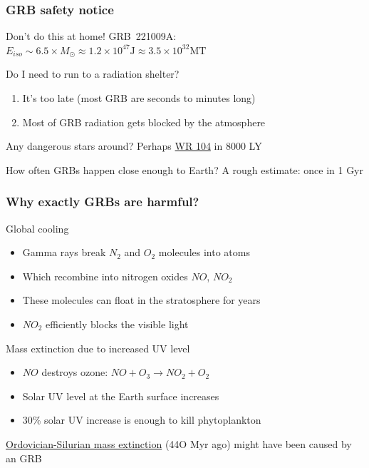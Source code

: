 \documentclass[aspectratio=169]{beamer}
\begin{document}
\begin{frame}
\frametitle{GRB safety notice}
\begin{block}{Don't do this at home!}
GRB~221009A: $E_{iso} \sim 6.5 \times M_\odot \approx 1.2 \times 10^{47} \mathrm{J} \approx 3.5 \times 10^{32} \mathrm{MT}$  \cite{arXiv:2302.13383}
\end{block}

\begin{block}{Do I need to run to a radiation shelter?}
\begin{enumerate}
\item It's too late (most GRB are seconds to minutes long)
\item Most of GRB radiation gets blocked by the atmosphere
\end{enumerate}
\end{block}

\begin{block}{Any dangerous stars around?}
Perhaps \href{https://en.wikipedia.org/wiki/WR_104}{WR 104} in 8000 LY
\end{block}

\begin{block}{How often GRBs happen close enough to Earth?}
A rough estimate: once in 1 Gyr
\end{block}
\end{frame}

\begin{frame}
\frametitle{Why exactly GRBs are harmful?}
\begin{block}{Global cooling}
\begin{itemize}
\item Gamma rays break $N_2$ and $O_2$ molecules into atoms
\item Which recombine into nitrogen oxides $NO$, $NO_2$
\item These molecules can float in the stratosphere for years
\item $NO_2$ efficiently blocks the visible light
\end{itemize}
\end{block}

\begin{block}{Mass extinction due to increased UV level}
\begin{itemize}
\item $NO$ destroys ozone: $NO + O_3 \to NO_2 + O_2$
\item Solar UV level at the Earth surface increases
\item 30\% solar UV increase is enough to kill phytoplankton 
\end{itemize}
\href{http://en.wikipedia.org/wiki/Ordovician\%E2\%80\%93Silurian_extinction_events}{Ordovician-Silurian mass extinction}
(44O Myr ago) might have been caused by an GRB \cite{arXiv:astro-ph/0309415}
\end{block}
\end{frame}
\end{document}
